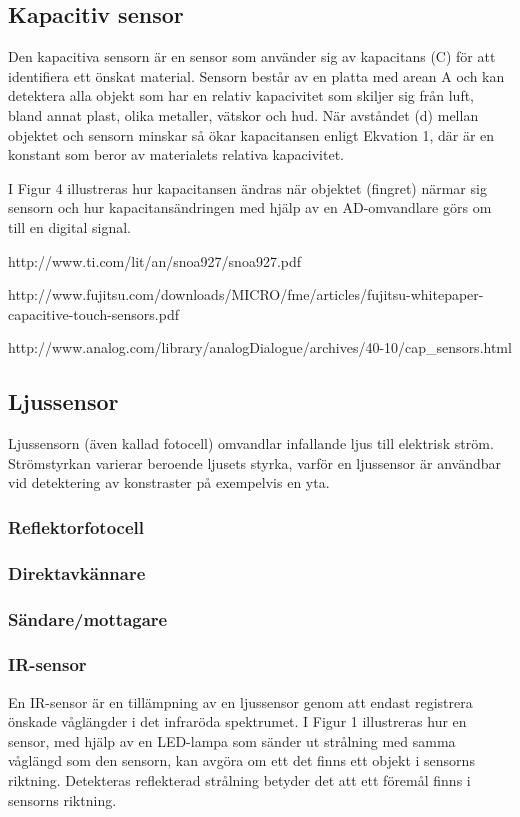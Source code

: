 \documentclass[11pt]{article}
\begin{document}
\begin{flushleft}
\subsection{Kapacitiv sensor}
Den kapacitiva sensorn är en sensor som använder sig av kapacitans (C) för att identifiera ett önskat material. Sensorn består av en platta med arean A och kan detektera alla objekt som har en relativ kapacivitet som skiljer sig från luft, bland annat plast, olika metaller, vätskor och hud. När avståndet (d) mellan objektet och sensorn minskar så ökar kapacitansen enligt Ekvation 1, där  är en konstant som beror av materialets relativa kapacivitet. 

I Figur 4 illustreras hur kapacitansen ändras när objektet (fingret) närmar sig sensorn och hur kapacitansändringen med hjälp av en AD-omvandlare görs om till en digital signal. 


http://www.ti.com/lit/an/snoa927/snoa927.pdf

http://www.fujitsu.com/downloads/MICRO/fme/articles/fujitsu-whitepaper-capacitive-touch-sensors.pdf

http://www.analog.com/library/analogDialogue/archives/40-10/cap_sensors.html



\subsection{Ljussensor}
Ljussensorn (även kallad fotocell) omvandlar infallande ljus till elektrisk ström. Strömstyrkan varierar beroende ljusets styrka, varför en ljussensor är användbar vid detektering av konstraster på exempelvis en yta.

\subsubsection{Reflektorfotocell}



\subsubsection{Direktavkännare}

\subsubsection{Sändare/mottagare}

\subsubsection{IR-sensor}
En IR-sensor är en tillämpning av en ljussensor genom att endast registrera önskade våglängder i det infraröda spektrumet. I Figur 1 illustreras hur en sensor, med hjälp av en LED-lampa som sänder ut strålning med samma våglängd som den sensorn, kan avgöra om ett det finns ett objekt i sensorns riktning. Detekteras reflekterad strålning betyder det att ett föremål finns i sensorns riktning.


\end{flushleft}
\end{document}
